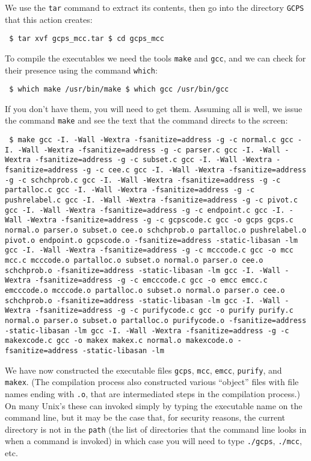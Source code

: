 \documentclass[12pt]{article}
\theoremstyle{definition}
\begin{document}
We use the \texttt{tar} command to
extract its contents, then go into the directory \texttt{GCPS} that this action creates:
\begin{obeylines}
  \texttt{
    \$ tar xvf gcps\_mcc.tar
    \$ cd gcps\_mcc
    }
\end{obeylines}
\bigskip

To compile the executables we need the tools \texttt{make} and
\texttt{gcc}, and we can check for their presence using
the command \texttt{which}:
\begin{obeylines}
  \texttt{
    \$ which make
    /usr/bin/make
    \$ which gcc
    /usr/bin/gcc
    }
\end{obeylines}
\bigskip \noindent If you don't have them, you will need to get them.
Assuming all is well, we issue the command \texttt{make} and see the
text that the command directs to the screen:
\begin{obeylines}
  \texttt{
    \$ make
gcc -I. -Wall -Wextra -fsanitize=address -g -c normal.c 
gcc -I. -Wall -Wextra -fsanitize=address -g -c parser.c
gcc -I. -Wall -Wextra -fsanitize=address -g -c subset.c
gcc -I. -Wall -Wextra -fsanitize=address -g -c cee.c
gcc -I. -Wall -Wextra -fsanitize=address -g -c schchprob.c
gcc -I. -Wall -Wextra -fsanitize=address -g -c partalloc.c
gcc -I. -Wall -Wextra -fsanitize=address -g -c pushrelabel.c
gcc -I. -Wall -Wextra -fsanitize=address -g -c pivot.c 
gcc -I. -Wall -Wextra -fsanitize=address -g -c endpoint.c
gcc -I. -Wall -Wextra -fsanitize=address -g -c gcpscode.c
gcc -o gcps gcps.c normal.o parser.o subset.o cee.o schchprob.o partalloc.o pushrelabel.o pivot.o endpoint.o gcpscode.o -fsanitize=address -static-libasan -lm
gcc -I. -Wall -Wextra -fsanitize=address -g -c mcccode.c
gcc -o mcc mcc.c mcccode.o partalloc.o subset.o normal.o parser.o cee.o schchprob.o  -fsanitize=address -static-libasan -lm
gcc -I. -Wall -Wextra -fsanitize=address -g -c emcccode.c
gcc -o emcc emcc.c emcccode.o mcccode.o partalloc.o subset.o normal.o parser.o cee.o schchprob.o  -fsanitize=address -static-libasan -lm
gcc -I. -Wall -Wextra -fsanitize=address -g -c purifycode.c
gcc -o purify purify.c normal.o parser.o subset.o partalloc.o purifycode.o -fsanitize=address -static-libasan -lm
gcc -I. -Wall -Wextra -fsanitize=address -g -c makexcode.c
gcc -o makex makex.c normal.o makexcode.o -fsanitize=address -static-libasan -lm
    } 
\end{obeylines}
\bigskip

We have now constructed the executable files \texttt{gcps},
\texttt{mcc}, \texttt{emcc}, \texttt{purify}, and \texttt{makex}.
(The compilation process also constructed various ``object'' files
with file names ending with \texttt{.o}, that are intermediated steps
in the compilation process.)  On many Unix's
these can invoked simply by typing the executable name on the command
line, but it may be the case that, for security reasons, the current
directory is not in the \texttt{path} (the list of directories that
the command line looks in when a command is invoked) in which case you
will need to type \texttt{./gcps}, \texttt{./mcc}, etc.
\end{document}
